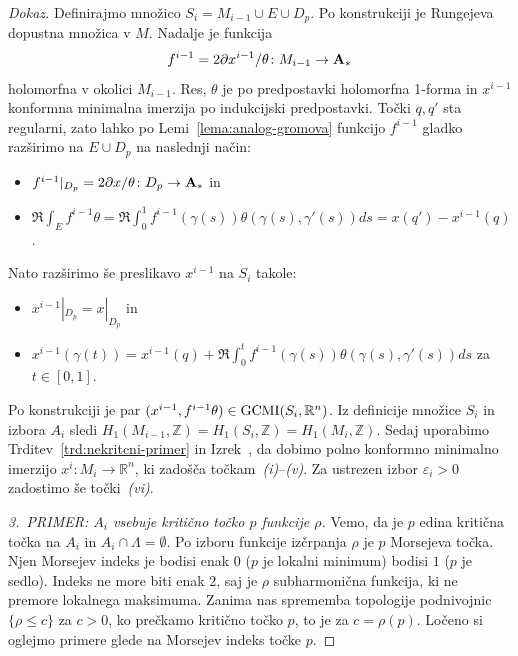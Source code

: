 \documentclass[12pt,a4paper,twoside]{article}
\theoremstyle{definition} %
\newenvironment{dokaz}[1][Dokaz]{\begin{proof}[#1]}{\end{proof}}
\theoremstyle{plain} %
\numberwithin{equation}{section}  %
\begin{document}
\begin{dokaz}
Definirajmo množico $S_{i} = M_{i-1} \cup E \cup D_{p}$. Po konstrukciji je Rungejeva dopustna množica v $M$. 
Nadalje je funkcija 
\begin{gather*}
f^{i-1} = 2 \partial x^{i-1} / \theta \colon M_{i-1} \to \textup{\textbf{A}}_{*}
\end{gather*} 
holomorfna v okolici $M_{i-1}$. Res, $\theta$ je po predpostavki holomorfna 1-forma in $x^{i-1}$ konformna minimalna imerzija po indukcijski predpostavki. 
Točki $q, q'$ sta regularni, zato lahko po Lemi~\ref{lema:analog-gromova} funkcijo $f^{i-1}$ gladko razširimo na $E \cup D_{p}$ na naslednji način:
\begin{itemize}
\item $ f^{i-1}|_{D_{p}} = 2 \partial x / \theta \colon D_{p} \to \textup{\textbf{A}}_{*} $ in
\item $ \Re \int_{E} f^{i-1} \theta = \Re \int_{0}^{1} f^{i-1}(\gamma(s)) \theta(\gamma(s), \gamma '(s)) ds = x(q') - x^{i-1}(q) $.
\end{itemize}
%
Nato razširimo še preslikavo $x^{i-1}$ na $S_{i}$ takole:
\begin{itemize}
\item $ x^{i-1}|_{D_{p}} = x|_{D_{p}} $ in
\item $ x^{i-1}(\gamma(t)) = x^{i-1}(q) + \Re \int_{0}^{t} f^{i-1}(\gamma(s)) \theta(\gamma(s), \gamma '(s)) ds$ za $t \in [0,1]$.
\end{itemize}
%
Po konstrukciji je par $(x^{i-1}, f^{i-1} \theta) \in \textup{GCMI}(S_{i}, \mathbb{R}^{n})$. Iz definicije množice $S_{i}$ in izbora $A_{i}$ sledi $H_{1}(M_{i-1}, \mathbb{Z}) = H_{1}(S_{i}, \mathbb{Z}) = H_{1}(M_{i}, \mathbb{Z})$. 
Sedaj uporabimo Trditev~\ref{trd:nekritcni-primer} in Izrek~\cite[Theorem~3.4.1]{alarcon2021minimal},
da dobimo polno konformno minimalno imerzijo $x^{i} \colon M_{i} \to \mathbb{R}^{n}$, ki zadošča točkam~\textit{(i)}--\textit{(v)}. Za ustrezen izbor $\varepsilon_{i} > 0$ zadostimo še točki~\textit{(vi)}. \newline

\textit{3.~PRIMER: $A_{i}$ vsebuje kritično točko $p$ funkcije $\rho$.} \newline
Vemo, da je $p$ edina kritična točka na $A_{i}$ in $A_{i} \cap \Lambda = \emptyset$. Po izboru funkcije izčrpanja $\rho$ je $p$ Morsejeva točka.
Njen Morsejev indeks je bodisi enak $0$ ($p$ je lokalni minimum) bodisi $1$ ($p$ je sedlo). Indeks ne more biti enak $2$, saj je $\rho$ subharmonična funkcija, ki ne premore lokalnega maksimuma.
Zanima nas sprememba topologije podnivojnic $\{ \rho \leq c \}$ za $c>0$, ko prečkamo kritično točko $p$, to je za $c = \rho(p)$. Ločeno si oglejmo primere glede na Morsejev indeks točke $p$. \newline


\end{dokaz}
\end{document}
